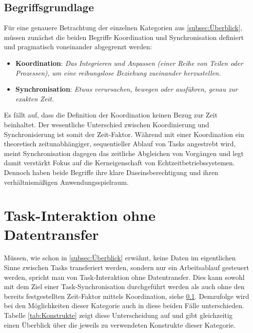 \documentclass{llncs}
\begin{document}
\subsection{Begriffsgrundlage}
\label{subsec:Begriffsgrundlage}
Für eine genauere Betrachtung der einzelnen Kategorien aus \ref{subsec:Überblick}, müssen zunächst die beiden Begriffe Koordination und Synchronisation definiert und pragmatisch voneinander abgegrenzt werden:
\begin{itemize}
	\setlength\itemsep{1em} %
	\item \textbf{Koordination}: \textit{\glqq Das Integrieren und Anpassen (einer Reihe von Teilen oder Prozessen), um eine reibungslose Beziehung zueinander herzustellen.\grqq} \autocite[vgl.][80]{Cooling2017}
	\item \textbf{Synchronisation}: \textit{\glqq Etwas verursachen, bewegen oder ausführen, genau zur exakten Zeit.\grqq} \autocite[vgl.][80]{Cooling2017}
\end{itemize}
Es fällt auf, dass die Definition der Koordination keinen Bezug zur Zeit beinhaltet. Der wesentliche Unterschied zwischen Koordinierung und Synchronisierung ist somit der Zeit-Faktor. Während mit einer Koordination ein theoretisch zeitunabhängiger, sequentieller Ablauf von Tasks angestrebt wird, meint Synchronisation dagegen das zeitliche Abgleichen von Vorgängen und legt damit verstärkt Fokus auf die Kerneigenschaft von Echtzeitbetriebssystemen. Dennoch haben beide Begriffe ihre klare Daseinsberechtigung und ihren verhältnismäßigen Anwendungsspielraum.

\section{Task-Interaktion ohne Datentransfer}
\label{sub:Task_Interaktion_ohne_Datentransfer}
Müssen, wie schon in \ref{subsec:Überblick} erwähnt, keine Daten im eigentlichen Sinne zwischen Tasks transferiert werden, sondern nur ein Arbeitsablauf gesteuert werden, spricht man von Task-Interaktion ohne Datentransfer. Dies kann sowohl mit dem Ziel einer Task-Synchronisation durchgeführt werden als auch ohne den bereits festgestellten Zeit-Faktor mittels Koordination, siehe \ref{subsec:Begriffsgrundlage}. Demzufolge wird bei den Möglichkeiten dieser Kategorie auch in diese beiden Fälle unterschieden. Tabelle \ref{tab:Konstrukte} zeigt diese Unterscheidung auf und gibt gleichzeitig einen Überblick über die jeweils zu verwendeten Konstrukte dieser Kategorie.
\end{document}
